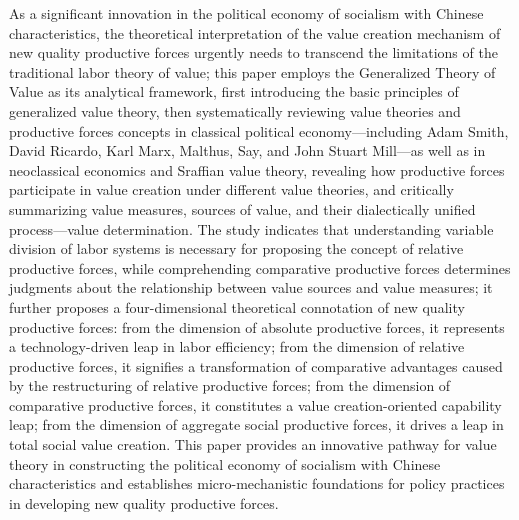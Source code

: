 \begin{abstract*}

As a significant innovation in the political economy of socialism with Chinese characteristics, the theoretical interpretation of the value creation mechanism of new quality productive forces urgently needs to transcend the limitations of the traditional labor theory of value; this paper employs the Generalized Theory of Value as its analytical framework, first introducing the basic principles of generalized value theory, then systematically reviewing value theories and productive forces concepts in classical political economy—including Adam Smith, David Ricardo, Karl Marx, Malthus, Say, and John Stuart Mill—as well as in neoclassical economics and Sraffian value theory, revealing how productive forces participate in value creation under different value theories, and critically summarizing value measures, sources of value, and their dialectically unified process—value determination. The study indicates that understanding variable division of labor systems is necessary for proposing the concept of relative productive forces, while comprehending comparative productive forces determines judgments about the relationship between value sources and value measures; it further proposes a four-dimensional theoretical connotation of new quality productive forces: from the dimension of absolute productive forces, it represents a technology-driven leap in labor efficiency; from the dimension of relative productive forces, it signifies a transformation of comparative advantages caused by the restructuring of relative productive forces; from the dimension of comparative productive forces, it constitutes a value creation-oriented capability leap; from the dimension of aggregate social productive forces, it drives a leap in total social value creation. This paper provides an innovative pathway for value theory in constructing the political economy of socialism with Chinese characteristics and establishes micro-mechanistic foundations for policy practices in developing new quality productive forces.


\end{abstract*}
